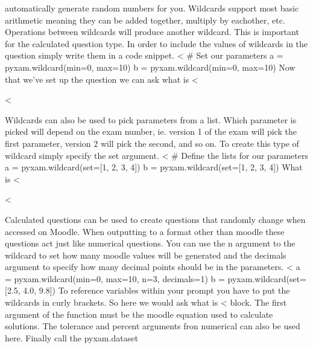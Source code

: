 \documentclass[12pt]{exam}
\begin{document}
\begin{questions}
                automatically generate random numbers for you. Wildcards support most basic arithmetic meaning they can
                be added together, multiply by eachother, etc. Operations between wildcards will produce another
                wildcard. This is important for the calculated question type. In order to include the values of
                wildcards in the question simply write them in a code snippet.
<%
# Set our parameters
a = pyxam.wildcard(min=0, max=10)
b = pyxam.wildcard(min=0, max=10)
                Now that we've set up the question we can ask what is <%
                \begin{solution}
                    <%
                \end{solution}
                Wildcards can also be used to pick parameters from a list. Which parameter is picked will depend on the
                exam number, ie. version 1 of the exam will pick the first parameter, version 2 will pick the second,
                and so on. To create this type of wildcard simply specify the set argument.
<%
# Define the lists for our parameters
a = pyxam.wildcard(set=[1, 2, 3, 4])
b = pyxam.wildcard(set=[1, 2, 3, 4])
                What is <%
                \begin{solution}
                    <%
                \end{solution}
                Calculated questions can be used to create questions that randomly change when accessed on Moodle. When
                outputting to a format other than moodle these questions act just like numerical questions. You can
                use the n argument to the wildcard to set how many moodle values will be generated and the decimals
                argument to specify how many decimal points should be in the parameters.
<%
a = pyxam.wildcard(min=0, max=10, n=3, decimals=1)
b = pyxam.wildcard(set=[2.5, 4.0, 9.8])
                To reference variables within your prompt you have to put the wildcards in curly brackets. So here we
                would ask what is <%
                block. The first argument of the function must be the moodle equation used to calculate solutions.
                The tolerance and percent arguments fron numerical can also be used here. Finally call the pyxam.dataset

\end{questions}
\end{document}
